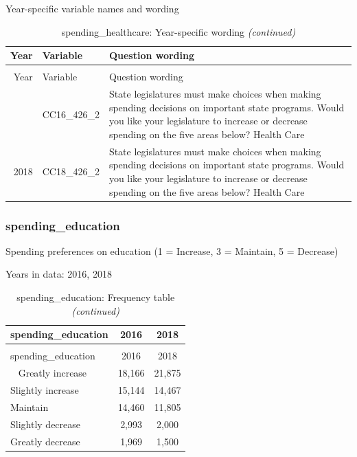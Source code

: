 \documentclass[12pt]{article}
\begin{document}
Year-specific variable names and wording

\begin{longtable}[t]{rl>{\raggedright\arraybackslash}p{10cm}}
\caption{\label{tab:unnamed-chunk-4}spending\_healthcare: Year-specific wording}\\
\toprule
Year & Variable & Question wording\\
\midrule
\endfirsthead
\caption[]{spending\_healthcare: Year-specific wording \textit{(continued)}}\\
\toprule
Year & Variable & Question wording\\
\midrule
\endhead
\
\endfoot
\bottomrule
\endlastfoot
2016 & CC16\_426\_2 & State legislatures must make choices when making spending decisions on important state programs. Would you like your legislature to increase or decrease spending on the five areas below? Health Care\\
2018 & CC18\_426\_2 & State legislatures must make choices when making spending decisions on important state programs. Would you like your legislature to increase or decrease spending on the five areas below? Health Care\\*
\end{longtable}

\subsubsection{spending\_education}\label{spending_education}

Spending preferences on education (1 = Increase, 3 = Maintain, 5 =
Decrease)

Years in data: 2016, 2018

\begin{longtable}[t]{lcc}
\caption{\label{tab:unnamed-chunk-4}spending\_education: Frequency table}\\
\toprule
spending\_education & 2016 & 2018\\
\midrule
\endfirsthead
\caption[]{spending\_education: Frequency table \textit{(continued)}}\\
\toprule
spending\_education & 2016 & 2018\\
\midrule
\endhead
\
\endfoot
\bottomrule
\endlastfoot
Greatly increase & 18,166 & 21,875\\
Slightly increase & 15,144 & 14,467\\
Maintain & 14,460 & 11,805\\
Slightly decrease & 2,993 & 2,000\\
Greatly decrease & 1,969 & 1,500\\*
\end{longtable}
\end{document}
